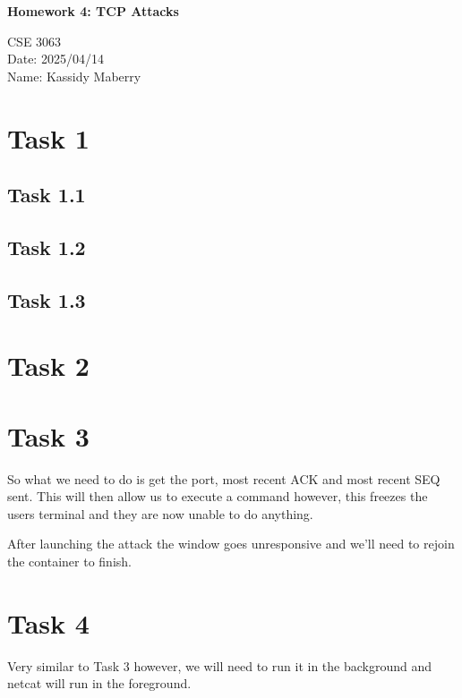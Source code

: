 \documentclass[12pt]{article}
\newcommand{\PLtitle}{\setlength{\parindent}{0pt}
\begin{center}

  \huge{\textbf{Homework \Lab: \Ltitle\\}}
  \normalsize 

  CSE 3063 \\
  Date: \date\\
  Name: \author\\
  


\end{center}
}
\def\Lab{4}
\def\Ltitle{TCP Attacks}
\def\author{Kassidy Maberry}
\def\date{2025/04/14}
\begin{document}
\PLtitle

\section*{Task 1}

\subsection*{Task 1.1}

\subsection*{Task 1.2}

\subsection*{Task 1.3}

\section*{Task 2}

\section*{Task 3}
So what we need to do is get the port, most recent ACK and most recent SEQ 
sent. This will then allow us to execute a command however, this freezes the 
users terminal and they are now unable to do anything.

After launching the attack the window goes unresponsive and we'll need to 
rejoin the container to finish. 

\section*{Task 4}
Very similar to Task 3 however, we will need to run it in the background 
and netcat will run in the foreground.
\end{document}
